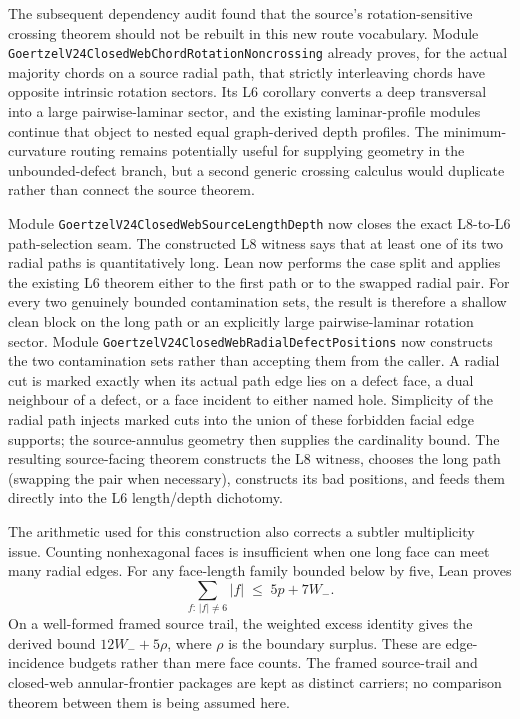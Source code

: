 \documentclass[11pt]{article}
\theoremstyle{definition}
\begin{document}
The subsequent dependency audit found that the source's rotation-sensitive
crossing theorem should not be rebuilt in this new route vocabulary.  Module
\texttt{GoertzelV24ClosedWebChordRotationNoncrossing} already proves, for the
actual majority chords on a source radial path, that strictly interleaving
chords have opposite intrinsic rotation sectors.  Its L6 corollary converts a
deep transversal into a large pairwise-laminar sector, and the existing
laminar-profile modules continue that object to nested equal graph-derived
depth profiles.  The minimum-curvature routing remains potentially useful for
supplying geometry in the unbounded-defect branch, but a second generic
crossing calculus would duplicate rather than connect the source theorem.

Module \texttt{GoertzelV24ClosedWebSourceLengthDepth} now closes the exact
L8-to-L6 path-selection seam.  The constructed L8 witness says that at least
one of its two radial paths is quantitatively long.  Lean now performs the case
split and applies the existing L6 theorem either to the first path or to the
swapped radial pair.  For every two genuinely bounded contamination sets, the
result is therefore a shallow clean block on the long path or an explicitly
large pairwise-laminar rotation sector.  Module
\texttt{GoertzelV24ClosedWebRadialDefectPositions} now constructs the two
contamination sets rather than accepting them from the caller.  A radial cut is
marked exactly when its actual path edge lies on a defect face, a dual
neighbour of a defect, or a face incident to either named hole.  Simplicity of
the radial path injects marked cuts into the union of these forbidden facial
edge supports; the source-annulus geometry then supplies the cardinality
bound.  The resulting source-facing theorem constructs the L8 witness, chooses
the long path (swapping the pair when necessary), constructs its bad positions,
and feeds them directly into the L6 length/depth dichotomy.

The arithmetic used for this construction also corrects a subtler
multiplicity issue.  Counting nonhexagonal faces is insufficient when one long
face can meet many radial edges.  For any face-length family bounded below by
five, Lean proves
\[
  \sum_{f:\,|f|\ne6}|f|\;\leq\;5p+7W_-.
\]
On a well-formed framed source trail, the weighted excess identity gives the
derived bound $12W_-+5\rho$, where $\rho$ is the boundary surplus.  These are
edge-incidence budgets rather than mere face counts.  The framed source-trail
and closed-web annular-frontier packages are kept as distinct carriers; no
comparison theorem between them is being assumed here.
\end{document}
